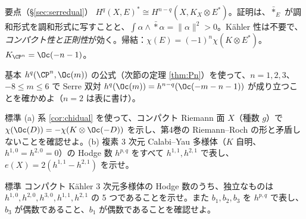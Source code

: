\begin{keybox}{要点（\S\ref{sec:serredual}）}
$H^q(X,E)^*\cong H^{n-q}(X,K_X\otimes E^*)$。証明は、$\bar\ast_E$ が調和形式を調和形式に写すことと、$\int\alpha\wedge\bar\ast\alpha=\|\alpha\|^2>0$。Kähler 性は不要で、\emph{コンパクト性と正則性}が効く。帰結：$\chi(E)=(-1)^n\chi(K\otimes E^*)$。$K_{\CP^n}=\Oc(-n-1)$。
\end{keybox}

\begin{prob}{基本}\label{p:serrePn}
$h^q(\CP^n,\Oc(m))$ の公式（次節の定理 \ref{thm:Pn}）を使って、$n=1,2,3$、$-8\le m\le 6$ で Serre 双対 $h^q(\Oc(m))=h^{n-q}(\Oc(-m-n-1))$ が成り立つことを確かめよ（$n=2$ は表に書け）。
\end{prob}
\begin{prob}{標準}\label{p:chiSerre}
(a) 系 \ref{cor:chidual} を使って、コンパクト Riemann 面 $X$（種数 $g$）で $\chi(\Oc(D))=-\chi(K\otimes\Oc(-D))$ を示し、第4巻の Riemann--Roch の形と矛盾しないことを確認せよ。(b) 複素 3 次元 Calabi--Yau 多様体（$K$ 自明、$h^{1,0}=h^{2,0}=0$）の Hodge 数 $h^{p,q}$ をすべて $h^{1,1},h^{2,1}$ で表し、$e(X)=2(h^{1,1}-h^{2,1})$ を示せ。
\end{prob}
\begin{prob}{標準}\label{p:hodgesym}
コンパクト Kähler 3 次元多様体の Hodge 数のうち、独立なものは $h^{1,0},h^{2,0},h^{3,0},h^{1,1},h^{2,1}$ の 5 つであることを示せ。また $b_1,b_2,b_3$ を $h^{p,q}$ で表し、$b_3$ が偶数であること、$b_1$ が偶数であることを確認せよ。
\end{prob}

